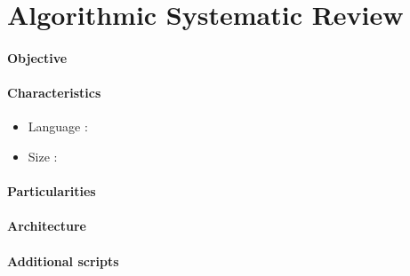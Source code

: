 \newpage

\section{Algorithmic Systematic Review}




\paragraph{Objective}

\paragraph{Characteristics}

\begin{itemize}
\item Language : 
\item Size :
\end{itemize}


\paragraph{Particularities}

\paragraph{Architecture}

\paragraph{Additional scripts}



